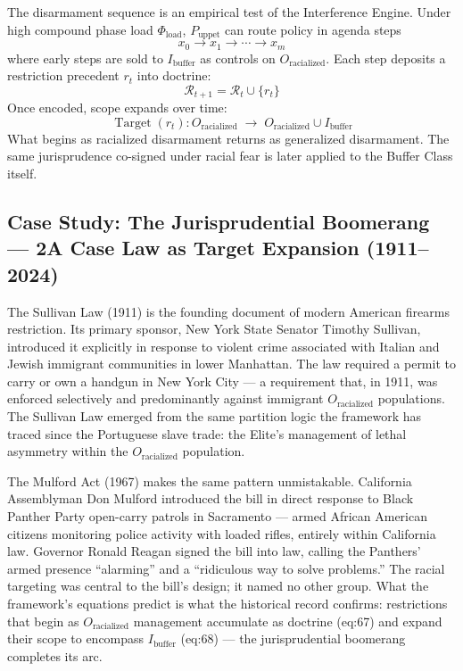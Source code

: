 \begin{keyinsight}
The disarmament sequence is an empirical test of the Interference Engine. Under high compound phase load $\Phi_{\text{load}}$, $P_{\text{uppet}}$ can route policy in agenda steps
\begin{equation}\label{eq:11.2-disarmament-agenda-path}
x_0 \rightarrow x_1 \rightarrow \cdots \rightarrow x_m
\end{equation}
where early steps are sold to $I_{\text{buffer}}$ as controls on $O_{\text{racialized}}$. Each step deposits a restriction precedent $r_t$ into doctrine:
\begin{equation}\label{eq:11.3-restriction-precedent-accumulation}
\mathcal{R}_{t+1}=\mathcal{R}_t \cup \{r_t\}
\end{equation}
Once encoded, scope expands over time:
\begin{equation}\label{eq:11.4-restriction-scope-expansion}
\operatorname{Target}(r_t): O_{\text{racialized}} \;\rightarrow\; O_{\text{racialized}} \cup I_{\text{buffer}}
\end{equation}
What begins as racialized disarmament returns as generalized disarmament. The same jurisprudence co-signed under racial fear is later applied to the Buffer Class itself.
\end{keyinsight}

\subsection*{Case Study: The Jurisprudential Boomerang --- 2A Case Law as Target Expansion (1911--2024)}

The Sullivan Law (1911) is the founding document of modern American firearms restriction. Its primary sponsor, New York State Senator Timothy Sullivan, introduced it explicitly in response to violent crime associated with Italian and Jewish immigrant communities in lower Manhattan. The law required a permit to carry or own a handgun in New York City --- a requirement that, in 1911, was enforced selectively and predominantly against immigrant $O_{\text{racialized}}$ populations. The Sullivan Law emerged from the same partition logic the framework has traced since the Portuguese slave trade: the Elite's management of lethal asymmetry within the $O_{\text{racialized}}$ population.

The Mulford Act (1967) makes the same pattern unmistakable. California Assemblyman Don Mulford introduced the bill in direct response to Black Panther Party open-carry patrols in Sacramento --- armed African American citizens monitoring police activity with loaded rifles, entirely within California law. Governor Ronald Reagan signed the bill into law, calling the Panthers' armed presence ``alarming'' and a ``ridiculous way to solve problems.'' The racial targeting was central to the bill's design; it named no other group. What the framework's equations predict is what the historical record confirms: restrictions that begin as $O_{\text{racialized}}$ management accumulate as doctrine (eq:67) and expand their scope to encompass $I_{\text{buffer}}$ (eq:68) --- the jurisprudential boomerang completes its arc.

